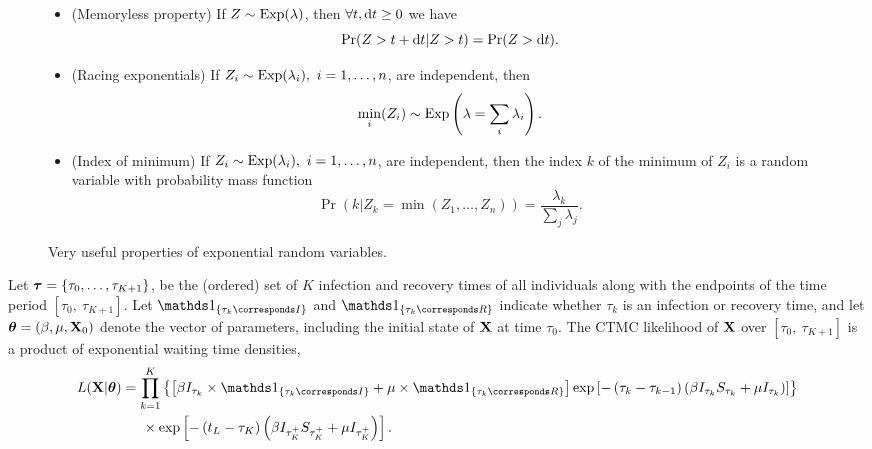 \begin{figure}[htbp]
	\caption{Very useful properties of exponential random variables.}
	\label{fig:exp_props}
	\begin{itemize}
		\item (Memoryless property) If $ Z\sim\mathrm{Exp}(\lambda)$, then $ \forall t,\mathrm{d} t\geq0 $  we have \begin{equation}
		 \Pr(Z > t+\mathrm{d} t | Z>t) = \Pr(Z>\mathrm{d} t).
		\end{equation}
		\item (Racing exponentials) If $ Z_i\sim\mathrm{Exp}(\lambda_i),\ i=1,\dots,n $, are independent, then \begin{equation}
		\underset{i}{\mathrm{min}}(Z_i) \sim \mathrm{Exp}\left (\lambda = \sum_i\lambda_i\right ).
		\end{equation}
		\item (Index of minimum) If $ Z_i\sim\mathrm{Exp}(\lambda_i),\ i=1,\dots,n $, are independent, then the index $ k $ of the minimum of $ Z_i $ is a random variable with probability mass function \begin{equation}
		\Pr(k|Z_k = \min(Z_1,\dots,Z_n)) = \frac{\lambda_k}{\sum_j\lambda_j}.
		\end{equation} 
	\end{itemize}
\end{figure}

Let $ \boldsymbol{\tau} = \lbrace\tau_0,\dots,\tau_{K+1}\rbrace $, be the (ordered) set of $ K $ infection and recovery times of all individuals along with the endpoints of the time period $ [\tau_0,\ \tau_{K+1}] $. Let $ \ind{\tau_k \corresponds I} $ and $ \ind{\tau_k \corresponds R} $ indicate whether $ \tau_k $ is an infection or recovery time, and let $ \boldsymbol{\theta} = (\beta, \mu, \mathbf{X}_0) $ denote the vector of parameters, including the initial state of $ \mathbf{X} $ at time $ \tau_0 $. The CTMC likelihood of $ \mathbf{X} $ over $ [\tau_0,\ \tau_{K+1}] $ is a product of exponential waiting time densities,
\begin{align} 
\label{eqn:sir_subj_likelihood}
L(\bX| \btheta) &= \prod_{k = 1}^{K}\left \lbrace \left [\beta I_{\tau_k}\times\ind{\tau_k \corresponds I} + \mu\times\ind{\tau_k \corresponds R}\right ] \exp{\left [-\left (\tau_k - \tau_{k-1}\right )\left (\beta I_{\tau_k} S_{\tau_k} + \mu I_{\tau_k}\right )\right ]}\right \rbrace \nonumber \\
& \hspace{0.2in} \times \exp \left [-\left (t_L - \tau_K\right )\left (\beta I_{\tau_K^+}S_{\tau_K^+} + \mu I_{\tau_K^+}\right )\right ]. 
\end{align}

